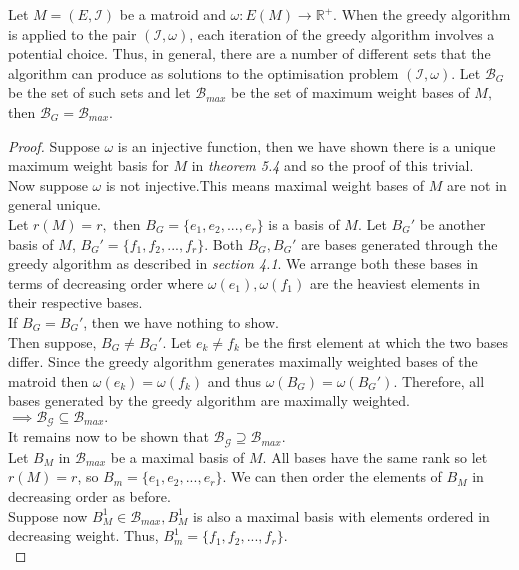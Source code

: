 \documentclass[../main.tex]{subfiles}
\begin{document}
\begin{prop}
Let $M=(E,\mathcal{I})$ be a matroid and $\omega: E(M) \longrightarrow \mathbb{R^+}.$ When the greedy algorithm is applied to the pair $(\mathcal{I},\omega)$, each iteration of the greedy algorithm involves a potential choice. Thus, in general, there are a number of different sets that the algorithm can produce as solutions to the optimisation problem $(\mathcal{I}, \omega).$ Let $\mathcal{B}_G$ be the set of such sets and let $\mathcal{B}_{max}$ be the set of maximum weight bases of $M,$ then $\mathcal{B}_G = \mathcal{B}_{max}.$
\end{prop}
\begin{proof}
Suppose $\omega$ is an injective function, then we have shown there is a unique maximum weight basis for $M$ in \textit{theorem 5.4} and so the proof of this trivial.\\
Now suppose $\omega$ is not injective.This means maximal weight bases of $M$ are not in general unique.\\
Let $r(M) = r,$ then $B_G = \{e_1,e_2, ..., e_r\}$ is a basis of $M.$ Let $B_G'$ be another basis of $M$, $B_G' = \{f_1, f_2, ..., f_r\}.$ Both $B_G, B_G'$ are bases generated through the greedy algorithm as described in \textit{section 4.1}.
We arrange both these bases in terms of decreasing order where $\omega(e_1), \omega(f_1)$ are the heaviest elements in their respective bases.\\
If $B_G = B_G'$, then we have nothing to show.\\
Then suppose, $B_G \neq B_G'$. Let $e_k \neq f_k$ be the first element at which the two bases differ. Since the greedy algorithm generates maximally weighted bases of the matroid then $\omega(e_k) = \omega(f_k)$ and thus $\omega(B_G) = \omega(B_G').$ Therefore, all bases generated by the greedy algorithm are maximally weighted.\\ $\implies \mathcal{B_G} \subseteq \mathcal{B}_{max}.$\\
It remains now to be shown that $\mathcal{B_G} \supseteq \mathcal{B}_{max}$.\\
Let $B_M$ in $\mathcal{B}_{max}$ be a maximal basis of $M.$ All bases have the same rank so let $r(M)=r$, so $B_m = \{e_1,e_2,...,e_r\}.$ We can then order the elements of $B_M$ in decreasing order as before.\\
\indent Suppose now $B_M^{1} \in \mathcal{B}_{max},B_M^{1}$ is also a maximal basis with elements ordered in decreasing weight. Thus, $B_m^{1} = \{f_1,f_2,...,f_r\}.$\\

\end{proof}
\end{document}
